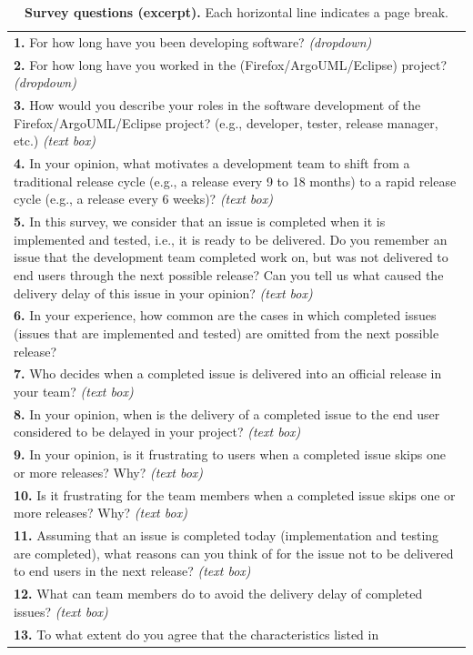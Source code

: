 \begin{table}[t!]
	\centering
	\footnotesize
	\caption{\textbf{Survey questions (excerpt).} Each horizontal line indicates a page break.
	\label{tbl:survey}}
		\begin{tabular}{p{}}
			\hline 
			\textbf{1.} For how long have you been developing software? {\em (dropdown)}\tabularnewline
			\textbf{2.} For how long have you worked in the (Firefox/ArgoUML/Eclipse) project?
			{\em (dropdown)}\tabularnewline
			\textbf{3.} How would you describe your roles in the software development of
			the Firefox/ArgoUML/Eclipse project? (e.g., developer, tester, release manager, etc.)
			{\em (text box)}\tabularnewline
			\textbf{4.} In your opinion, what motivates a development team to shift from
			a traditional release cycle (e.g., a release every 9 to 18 months)
			to a rapid release cycle (e.g., a release every 6
			weeks)? {\em (text box)}\tabularnewline
			\textbf{5.} In this survey, we consider that an issue is completed when it
			is implemented and tested, i.e., it is ready to be delivered. Do
			you remember an issue that the development team completed work on,
			but was not delivered to end users through the next possible release?
			Can you tell us what caused the delivery delay of this issue in your
			opinion? {\em (text box)}\tabularnewline
			\textbf{6.} In your experience, how common are the cases in which completed
			issues (issues that are implemented and tested) are omitted from the
			next possible release?\tabularnewline
			\textbf{7.} Who decides when a completed issue is delivered into an official
			release in your team? {\em (text box)}\tabularnewline
			\textbf{8.} In your opinion, when is the delivery of a completed issue to the
			end user considered to be delayed in your project? {\em (text box)}\tabularnewline
			\hline 
			\textbf{9.} In your opinion, is it frustrating to users when a completed issue
			skips one or more releases? Why? {\em (text box)}\tabularnewline
			\textbf{10.} Is it frustrating for the team members when a completed issue
			skips one or more releases? Why? {\em (text box)}\tabularnewline
			\hline 
			\textbf{11.} Assuming that an issue is completed today (implementation and
			testing are completed), what reasons can you think of for the issue
			not to be delivered to end users in the next release? {\em (text box)}\tabularnewline
			\hline 
			\textbf{12.} What can team members do to avoid the delivery delay of completed
			issues? {\em (text box)}\tabularnewline
			\textbf{13.} To what extent do you agree that the characteristics listed in

\end{tabular}
\end{table}
